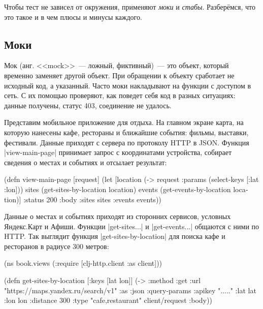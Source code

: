 Чтобы тест не зависел от окружения, применяют \emph{моки} и
\emph{стабы}. Разберёмся, что это такое и в чем плюсы и минусы каждого.

\subsection{Моки}


Мок (анг. <<mock>>~--- ложный, фиктивный)~--- это объект, который временно
заменяет другой объект. При обращении к объекту сработает не исходный код, а
указанный. Часто моки накладывают на функции с доступом в сеть. С их помощью
проверяют, как поведет себя код в разных ситуациях: данные получены, статус 403,
соединение не удалось.

\label{mobile-app-intro}


Представим мобильное приложение для отдыха. На главном экране карта, на которую
нанесены кафе, рестораны и ближайшие события: фильмы, выставки,
фестивали. Данные приходят с сервера по протоколу HTTP в JSON. Функция
\spverb|view-main-page| принимает запрос с координатами устройства, собирает
сведения о местах и событиях и отсылает результат:

\begin{english}
  \begin{clojure}
(defn view-main-page [request]
  (let [location (-> request :params (select-keys [:lat :lon]))
        sites (get-sites-by-location location)
        events (get-events-by-location location)]
    {:status 200
     :body {:sites sites :events events}}))
  \end{clojure}
\end{english}

Данные о местах и событиях приходят из сторонних сервисов, условных Яндекс.Карт
и Афиши. Функции \spverb|get-sites...| и \spverb|get-events...| общаются с ними
по HTTP. Так выглядит функция \spverb|get-sites-by-location| для поиска кафе и
ресторанов в радиусе 300 метров:


\begin{english}
  \begin{clojure}
(ns book.views
  (:require [clj-http.client :as client]))

(defn get-sites-by-location
  [{:keys [lat lon]}]
  (-> {:method :get
       :url "https://maps.yandex.ru/search/v1"
       :as :json
       :query-params {:apikey "....."
                      :lat lat :lon lon :distance 300
                      :type "cafe,restaurant"}}
      client/request
      :body))
  \end{clojure}
\end{english}

